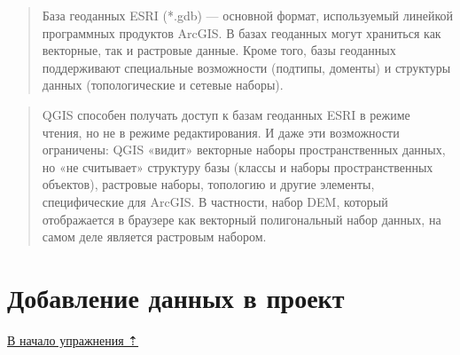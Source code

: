 \documentclass[
  12pt,
]{book}
\begin{document}
\begin{enumerate}
  \begin{quote}
  База геоданных ESRI (*.gdb) --- основной формат, используемый линейкой программных продуктов ArcGIS. В базах геоданных могут храниться как векторные, так и растровые данные. Кроме того, базы геоданных поддерживают специальные возможности (подтипы, доменты) и структуры данных (топологические и сетевые наборы).
  \end{quote}

  \begin{quote}
  QGIS способен получать доступ к базам геоданных ESRI в режиме чтения, но не в режиме редактирования. И даже эти возможности ограничены: QGIS «видит» векторные наборы пространственных данных, но «не считывает» структуру базы (классы и наборы пространственных объектов), растровые наборы, топологию и другие элементы, специфические для ArcGIS. В частности, набор DEM, который отображается в браузере как векторный полигональный набор данных, на самом деле является растровым набором.
  \end{quote}
\end{enumerate}

\hypertarget{map-design-quaternary-data}{%
\section{Добавление данных в проект}\label{map-design-quaternary-data}}

\protect\hyperlink{map-design-quaternary}{В начало упражнения ⇡}
\end{document}
